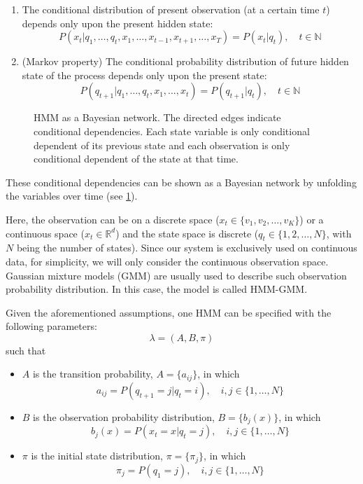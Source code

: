 \documentclass[12pt,final,twoside]{report}
\theoremstyle{plain}
\theoremstyle{definition}
\theoremstyle{remark}
\newcommand{\includetexfig}[1]{}
\begin{document}
\begin{enumerate}
  \item The conditional distribution of present observation (at a certain time $t$) depends only upon the present hidden state:
  \begin{equation}
    P(x_t|q_1, \dots, q_t, x_1, \dots, x_{t-1},x_{t+1},\dots,x_T) = P(x_t|q_t), \quad t \in \mathbb{N} 
    \label{eq:ob_prob}
  \end{equation}
  \item (Markov property) The conditional probability distribution of future hidden state of the process depends only upon the present state:
  \begin{equation}
    P(q_{t+1}|q_1, \dots, q_t, x_1, \dots, x_t) = P(q_{t+1}|q_t),\quad t \in \mathbb{N}
    \label{eq:markov_prop}
  \end{equation}
\end{enumerate}

\begin{figure}[t]
  \centering
  \includetexfig{hmm}
  \caption[HMM as a Bayesian network.]{HMM as a Bayesian network. The directed edges indicate conditional dependencies. Each state variable is only conditional dependent of its previous state and each observation is only conditional dependent of the state at that time.}
  \label{fig:hmm}
\end{figure}

These conditional dependencies can be shown as a Bayesian network by unfolding the variables over time (see \cref{fig:hmm}).

Here, the observation can be on a discrete space ($x_t \in \{v_1, v_2, \dots, v_K\}$) or a continuous space ($x_t \in \mathbb{R}^d$) and the state space is discrete ($q_t \in \{1, 2, \dots, N\}$, with $N$ being the number of states). Since our system is exclusively used on continuous data, for simplicity, we will only consider the continuous observation space. Gaussian mixture models (GMM) are usually used to describe such observation probability distribution. In this case, the model is called HMM-GMM.

Given the aforementioned assumptions, one HMM can be specified with the following parameters:
\[ \lambda = (A, B, \pi) \]
such that
\begin{itemize}
  \item $A$ is the transition probability, $A = \{a_{ij}\}$, in which 
    \[ a_{ij} = P(q_{t+1} = j | q_t = i), \quad i,j \in \{1, \dots, N\} \]
  \item $B$ is the observation probability distribution, $B = \{b_j(x)\}$, in which
    \[ b_j(x) = P(x_t = x | q_t = j), \quad i,j \in \{1, \dots, N\} \]
  \item $\pi$ is the initial state distribution, $\pi = \{\pi_j\}$, in which
    \[ \pi_j = P(q_1 = j), \quad i,j \in \{1, \dots, N\} \]
\end{itemize}
\end{document}
